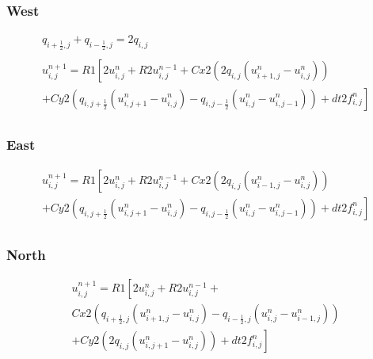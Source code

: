 \documentclass[norsk,11pt,a4paper]{article}
\begin{document}
\subsubsection*{West}
\begin{equation}\label{eq:west_general}
\begin{aligned}
q_{i+\frac{1}{2},j}+q_{i-\frac{1}{2},j}= 2q_{i,j}\\
\\
u^{n+1}_{i,j} = R1\left[ 2u^n_{i,j}+R2u^{n-1}_{i,j} + Cx2\left(2q_{i,j}(u^n_{i+1,j}-u^n_{i,j})\right)\right. \\
+ \left.Cy2\left(q_{i,j+\frac{1}{2}}(u^n_{i,j+1}-u^n_{i,j})-q_{i,j-\frac{1}{2}}(u^n_{i,j}-u^n_{i,j-1})\right) + dt2 f^n_{i,j}\right]\\
\end{aligned}
\end{equation}


\subsubsection*{East}

\begin{equation}\label{eq:east_general}
\begin{aligned}
u^{n+1}_{i,j} = R1\left[ 2u^n_{i,j}+R2u^{n-1}_{i,j} + Cx2\left(2q_{i,j}(u^n_{i-1,j}-u^n_{i,j})\right)\right. \\
+ \left.Cy2\left(q_{i,j+\frac{1}{2}}(u^n_{i,j+1}-u^n_{i,j})-q_{i,j-\frac{1}{2}}(u^n_{i,j}-u^n_{i,j-1})\right) + dt2 f^n_{i,j}\right]\\
\end{aligned}
\end{equation}

\subsubsection*{North}

\begin{equation}\label{eq:north_general}
\begin{aligned}
u^{n+1}_{i,j} = R1\left[ 2u^n_{i,j}+R2u^{n-1}_{i,j} + \right.\\
\left.Cx2\left(q_{i+\frac{1}{2},j}(u^n_{i+1,j}-u^n_{i,j})-q_{i-\frac{1}{2},j}(u^n_{i,j}-u^n_{i-1,j})\right)\right. \\
+ \left.Cy2\left(2q_{i,j}(u^n_{i,j+1}-u^n_{i,j})\right) + dt2 f^n_{i,j}\right]\\
\end{aligned}
\end{equation}
\end{document}

